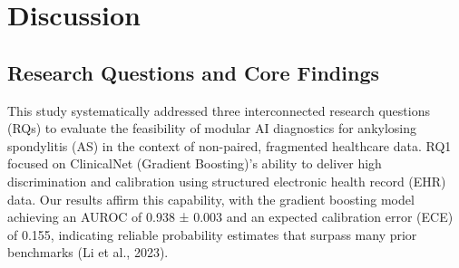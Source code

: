 \documentclass[12pt, a4paper]{article}
\begin{document}
\begin{table}[H]
\centering
\small
\caption{Performance Impact of Data Enhancement Strategies}
\label{tab:enhancement_impact}
\end{table}



\section{Discussion}

\subsection{Research Questions and Core Findings}
This study systematically addressed three interconnected research questions (RQs) to evaluate the feasibility of modular AI diagnostics for ankylosing spondylitis (AS) in the context of non-paired, fragmented healthcare data. RQ1 focused on ClinicalNet (Gradient Boosting)'s ability to deliver high discrimination and calibration using structured electronic health record (EHR) data. Our results affirm this capability, with the gradient boosting model achieving an AUROC of 0.938 ± 0.003 and an expected calibration error (ECE) of 0.155, indicating reliable probability estimates that surpass many prior benchmarks (Li et al., 2023). 
\end{document}
